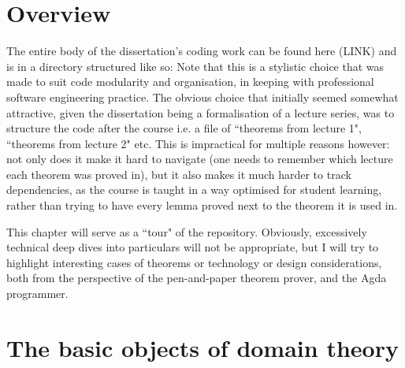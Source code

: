 \documentclass[12pt,a4paper,twoside,openright]{report}
\begin{document}
\section{Overview}
The entire body of the dissertation's coding work can be found here (LINK) and is in a directory structured like so:
\vspace{5mm}
Note that this is a stylistic choice that was made to suit code modularity and organisation, in keeping with professional software engineering practice. The obvious choice that initially seemed somewhat attractive, given the dissertation being a formalisation of a lecture series, was to structure the code after the course i.e. a file of ``theorems from lecture 1", ``theorems from lecture 2" etc. This is impractical for multiple reasons however: not only does it make it hard to navigate (one needs to remember which lecture each theorem was proved in), but it also makes it much harder to track dependencies, as the course is taught in a way optimised for student learning, rather than trying to have every lemma proved next to the theorem it is used in. 

This chapter will serve as a ``tour" of the repository. Obviously, excessively technical deep dives into particulars will not be appropriate, but I will try to highlight interesting cases of theorems or technology or design considerations, both from the perspective of the pen-and-paper theorem prover, and the Agda programmer. 

\section{The basic objects of domain theory}
\end{document}
